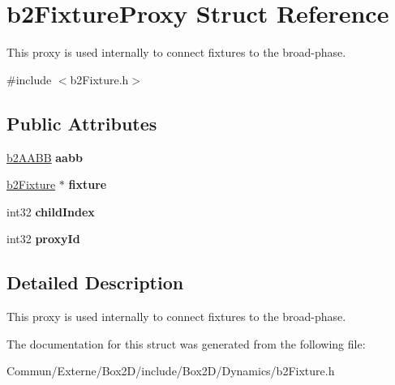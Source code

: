 \hypertarget{structb2_fixture_proxy}{}\section{b2\+Fixture\+Proxy Struct Reference}
\label{structb2_fixture_proxy}


This proxy is used internally to connect fixtures to the broad-\/phase.  




{\ttfamily \#include $<$b2\+Fixture.\+h$>$}

\subsection*{Public Attributes}
\begin{DoxyCompactItemize}
\item 
\hyperlink{structb2_a_a_b_b}{b2\+A\+A\+BB} {\bfseries aabb}\hypertarget{structb2_fixture_proxy_ad8950f61ce28cfa5b676065d4d843da7}{}\label{structb2_fixture_proxy_ad8950f61ce28cfa5b676065d4d843da7}

\item 
\hyperlink{classb2_fixture}{b2\+Fixture} $\ast$ {\bfseries fixture}\hypertarget{structb2_fixture_proxy_a3a0842dc9699c25658548c2005d0ef62}{}\label{structb2_fixture_proxy_a3a0842dc9699c25658548c2005d0ef62}

\item 
int32 {\bfseries child\+Index}\hypertarget{structb2_fixture_proxy_a2edb15552cf71f48dacc3608bb134166}{}\label{structb2_fixture_proxy_a2edb15552cf71f48dacc3608bb134166}

\item 
int32 {\bfseries proxy\+Id}\hypertarget{structb2_fixture_proxy_aa0ca7e71341368fe6c6913fb39c7283b}{}\label{structb2_fixture_proxy_aa0ca7e71341368fe6c6913fb39c7283b}

\end{DoxyCompactItemize}


\subsection{Detailed Description}
This proxy is used internally to connect fixtures to the broad-\/phase. 

The documentation for this struct was generated from the following file\+:\begin{DoxyCompactItemize}
\item 
Commun/\+Externe/\+Box2\+D/include/\+Box2\+D/\+Dynamics/b2\+Fixture.\+h\end{DoxyCompactItemize}

